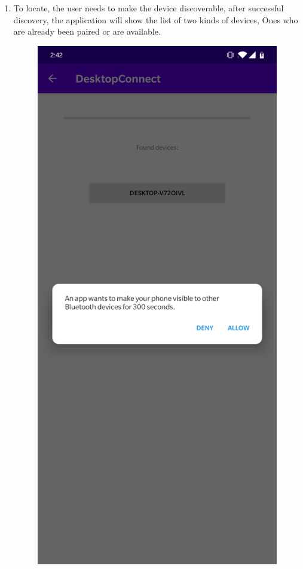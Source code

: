 \documentclass{article}
\begin{document}
\begin{enumerate}
\item To locate, the user needs to make the device discoverable,  after successful discovery, the
application will show the list of two kinds of devices, Ones who are already been paired or are
available.

\begin{figure}[h]
\centering
\includegraphics[scale=.07]{./discover.jpg}
\end{figure}


\end{enumerate}
\end{document}
